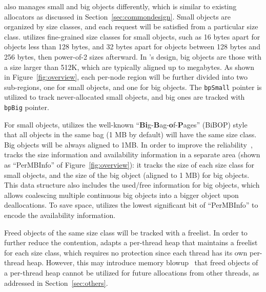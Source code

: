 
\NM{} also manages small and big objects differently, which is similar to existing allocators as discussed in Section~\ref{sec:commondesign}. Small objects are organized by size classes, and each request will be satisfied from a particular size class. \NA{} utilizes fine-grained size classes for small objects, such as 16 bytes apart for objects less than 128 bytes, and 32 bytes apart for objects between 128 bytes and 256 bytes, then power-of-2 sizes afterward. In \NM{}'s design, big objects are those with a size larger than 512K, which are typically aligned up to megabytes. As shown in Figure~\ref{fig:overview}, each per-node region will be further divided into two sub-regions, one for small objects, and one for big objects. The \texttt{bpSmall} pointer is utilized to track never-allocated small objects, and big ones are tracked with \texttt{bpBig} pointer. 

For small objects, \NM{} utilizes the well-known  ``\textbf{Bi}g-\textbf{B}ag-\textbf{o}f-\textbf{P}ages'' (BiBOP) style that all objects in the same bag (1 MB by default) will have the same size class. Big objects will be always aligned to 1MB. In order to improve the reliability~\cite{FreeGuard, Guarder}, \NM{} tracks the size information and availability information in a separate area (shown as ``PerMBInfo'' of Figure~\ref{fig:overview}): it tracks the size of each size class for small objects, and the size of the big object (aligned to 1 MB) for big objects. This data structure also includes the used/free information for big objects, which allows coalescing multiple continuous big objects into a bigger object upon deallocations. To save space, \NM{} utilizes the lowest significant bit of ``PerMBInfo'' to encode the availability information.

Freed objects of the same size class will be tracked with a freelist. In order to further reduce the contention, \NM{} adapts a per-thread heap that maintains a freelist for each size class, which requires no protection since each thread has its own per-thread heap. However, this may introduce memory blowup~\cite{Hoard} that freed objects of a per-thread heap cannot be utilized for future allocations from other threads, as addressed in Section~\ref{sec:others}. 

